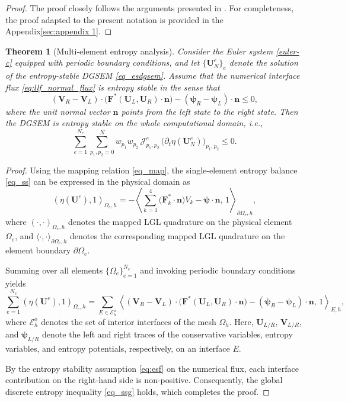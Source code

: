 \documentclass[fleqn,11pt]{amsart}
\newtheorem{theorem}{Theorem}[section]
\begin{document}
\begin{proof}
The proof closely follows the arguments presented in
\cite{fisher2012high,Fisher2013Discretely,wintermeyer2017entropy,Friedrich2018EntropyStable}.
For completeness, the proof adapted to the present notation is provided in the Appendix\eqref{sec:appendix 1}.
\end{proof}


\begin{theorem}[Multi-element entropy analysis]
Consider the Euler system \eqref{euler-c} equipped with periodic boundary conditions, and let
$\{\bm U_N^e\}_e$ denote the solution of the entropy-stable DGSEM \eqref{eq_esdgsem}.
Assume that the numerical interface flux \eqref{eq:llf_normal_flux} is entropy stable in the sense that
\begin{equation}
\label{eq:esf}    
(\bm V_R - \bm V_L)\cdot\bigl(\boldsymbol F^{*}(\bm U_L, \bm U_R)\cdot\bm n\bigr)
-
(\bm \psi_R - \bm \psi_L)\cdot\bm n \le 0,
\end{equation}
where the unit normal vector $\bm n$ points from the left state to the right state.
Then the DGSEM is entropy stable on the whole computational domain, i.e.,
\begin{equation}
\label{eq_ssg}
\sum_{e=1}^{N_e}\sum_{p_1,p_2=0}^N
w_{p_1} w_{p_2}\,
\mathcal{J}_{p_1,p_2}^e\,
\bigl(\partial_t \eta(\bm U_N^e)\bigr)_{p_1,p_2}
\le 0.
\end{equation}
\end{theorem}
\begin{proof}
Using the mapping relation \eqref{eq_map}, the single-element entropy balance \eqref{eq_ss} can be expressed in the physical domain as
\begin{equation*}
(\eta(\bm U^e), 1)_{\Omega_e,h}
=
-\left\langle
\sum_{k=1}^4 \bigl(\bm F_k^* \cdot \bm n\bigr) V_k
-
\bm \psi \cdot \bm n,
\, 1
\right\rangle_{\partial\Omega_e,h},
\end{equation*}
where $(\cdot,\cdot)_{\Omega_e,h}$ denotes the mapped LGL quadrature on the physical element $\Omega_e$, and
$\langle\cdot,\cdot\rangle_{\partial\Omega_e,h}$ denotes the corresponding mapped LGL quadrature on the element boundary $\partial\Omega_e$.

Summing over all elements $\{\Omega_e\}_{e=1}^{N_e}$ and invoking periodic boundary conditions yields
\begin{equation*}
\sum_{e=1}^{N_e} (\eta(\bm U^e), 1)_{\Omega_e,h}
=
\sum_{E\in\mathcal{E}_h^o}
\left\langle
(\bm V_R - \bm V_L)\cdot\bigl(\boldsymbol F^*(\bm U_L, \bm U_R)\cdot\bm n\bigr)
-
(\bm \psi_R - \bm \psi_L)\cdot\bm n,
\, 1
\right\rangle_{E,h},
\end{equation*}
where $\mathcal{E}_h^o$ denotes the set of interior interfaces of the mesh $\Omega_h$.
Here, $\bm U_{L/R}$, $\bm V_{L/R}$, and $\bm \psi_{L/R}$ denote the left and right traces of the conservative variables, entropy variables, and entropy potentials, respectively, on an interface $E$.

By the entropy stability assumption \eqref{eq:esf} on the numerical flux, each interface contribution on the right-hand side is non-positive. Consequently, the global discrete entropy inequality \eqref{eq_ssg} holds, which completes the proof.
\end{proof}
\end{document}
